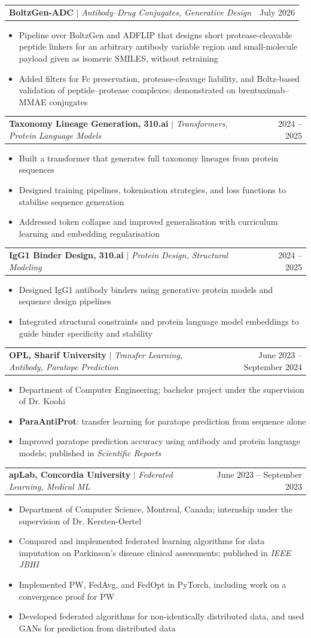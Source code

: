 \documentclass[letterpaper,11pt]{article}
\makeatletter
\newcommand{\resumeItem}[1]{\item\small{#1\vspace{-2pt}}}
\newcommand{\resumeProjectHeading}[2]{
    \item
    \begin{tabular*}{0.97\textwidth}{l@{\extracolsep{\fill}}r}
      \small#1 & #2 \\
    \end{tabular*}\vspace{-7pt}
}
\newcommand{\resumeItemListStart}{\begin{itemize}}
\newcommand{\resumeItemListEnd}{\end{itemize}\vspace{-5pt}}
\makeatother
\begin{document}
        \resumeProjectHeading
        {\textbf{BoltzGen-ADC} $|$ \footnotesize\emph{Antibody--Drug Conjugates, Generative Design}}{July 2026}
        \resumeItemListStart
            \resumeItem{Pipeline over BoltzGen and ADFLIP that designs short protease-cleavable peptide linkers for an arbitrary antibody variable region and small-molecule payload given as isomeric SMILES, without retraining}
            \resumeItem{Added filters for Fc preservation, protease-cleavage liability, and Boltz-based validation of peptide--protease complexes; demonstrated on brentuximab--MMAE conjugates}
        \resumeItemListEnd

        \resumeProjectHeading
        {\textbf{Taxonomy Lineage Generation, 310.ai} $|$ \footnotesize\emph{Transformers, Protein Language Models}}{2024 -- 2025}
        \resumeItemListStart
            \resumeItem{Built a transformer that generates full taxonomy lineages from protein sequences}
            \resumeItem{Designed training pipelines, tokenisation strategies, and loss functions to stabilise sequence generation}
            \resumeItem{Addressed token collapse and improved generalisation with curriculum learning and embedding regularisation}
        \resumeItemListEnd

        \resumeProjectHeading
        {\textbf{IgG1 Binder Design, 310.ai} $|$ \footnotesize\emph{Protein Design, Structural Modeling}}{2024 -- 2025}
        \resumeItemListStart
            \resumeItem{Designed IgG1 antibody binders using generative protein models and sequence design pipelines}
            \resumeItem{Integrated structural constraints and protein language model embeddings to guide binder specificity and stability}
        \resumeItemListEnd

        \resumeProjectHeading
        {\textbf{OPL, Sharif University} $|$ \footnotesize\emph{Transfer Learning, Antibody, Paratope Prediction}}{June 2023 -- September 2024}
        \resumeItemListStart
            \resumeItem{Department of Computer Engineering; bachelor project under the supervision of Dr. Koohi}
            \resumeItem{\textbf{ParaAntiProt}: transfer learning for paratope prediction from sequence alone}
            \resumeItem{Improved paratope prediction accuracy using antibody and protein language models; published in \emph{Scientific Reports}}
        \resumeItemListEnd

        \resumeProjectHeading
        {\textbf{apLab, Concordia University} $|$ \footnotesize\emph{Federated Learning, Medical ML}}{June 2023 -- September 2023}
        \resumeItemListStart
            \resumeItem{Department of Computer Science, Montreal, Canada; internship under the supervision of Dr. Kersten-Oertel}
            \resumeItem{Compared and implemented federated learning algorithms for data imputation on Parkinson's disease clinical assessments; published in \emph{IEEE JBHI}}
            \resumeItem{Implemented PW, FedAvg, and FedOpt in PyTorch, including work on a convergence proof for PW}
            \resumeItem{Developed federated algorithms for non-identically distributed data, and used GANs for prediction from distributed data}
        \resumeItemListEnd
\end{document}

